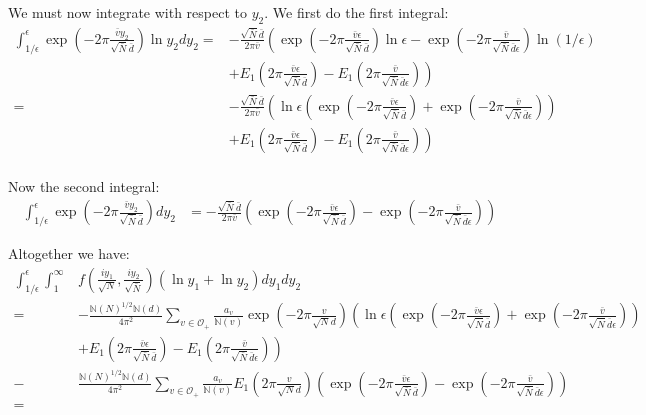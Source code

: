 \documentclass{article}
\theoremstyle{plain}
\begin{document}
We must now integrate with respect to $y_2$. We first do the first integral:
\begin{align*}
\int_{1/\epsilon}^{\epsilon} \exp \left( -2\pi \frac{\bar{v} y_2}{\sqrt{\bar{N}}\bar{d}}\right) \ln y_2 dy_2
 = & -\frac{\sqrt{\bar{N}}\bar{d}}{2 \pi\bar{v}} \left( \exp \left( -2\pi \frac{\bar{v} \epsilon}{\sqrt{\bar{N}}\bar{d}}\right) \ln \epsilon -  \exp \left( -2\pi \frac{\bar{v} }{\sqrt{\bar{N}}\bar{d}\epsilon}\right) \ln(1/\epsilon) \right. \\
 & + \left. E_1\left(2\pi \frac{\bar{v} \epsilon}{\sqrt{\bar{N}}\bar{d}}\right)-E_1\left( 2\pi \frac{\bar{v} }{\sqrt{\bar{N}}\bar{d}\epsilon}\right) \right)\\
= & -\frac{\sqrt{\bar{N}}\bar{d}}{2 \pi\bar{v}} \left( \ln \epsilon \left( \exp \left( -2\pi \frac{\bar{v} \epsilon}{\sqrt{\bar{N}}\bar{d}}\right) +  \exp \left( -2\pi \frac{\bar{v} }{\sqrt{\bar{N}}\bar{d}\epsilon}\right) \right) \right. \\
 & + \left. E_1\left(2\pi \frac{\bar{v} \epsilon}{\sqrt{\bar{N}}\bar{d}}\right)-E_1\left( 2\pi \frac{\bar{v} }{\sqrt{\bar{N}}\bar{d}\epsilon}\right) \right)\\
\end{align*}

Now the second integral:
\begin{align*}
\int_{1/ \epsilon}^{\epsilon} \exp \left( -2\pi \frac{\bar{v} y_2}{\sqrt{\bar{N}}\bar{d}}\right) dy_2 
& =  - \frac{\sqrt{\bar{N}}\bar{d}}{2 \pi \bar{v}} \left( \exp \left( -2\pi \frac{\bar{v} \epsilon}{\sqrt{\bar{N}}\bar{d}}\right) -  \exp \left( -2\pi \frac{\bar{v} }{\sqrt{\bar{N}}\bar{d}\epsilon}\right)\right)
\end{align*}

Altogether we have:
\begin{align*}
\int_{1/\epsilon}^{\epsilon} \int_{1}^{\infty} & f\left(\frac{iy_1}{\sqrt{N}},\frac{iy_2}{\sqrt{\bar{N}}}\right) (\ln y_1+\ln y_2)dy_1 dy_2 \\
= &- \frac{\mathbb{N}(N)^{1/2}\mathbb{N}(d)}{4 \pi^2 }\sum_{v \in \mathcal{O}_+}  \frac{a_v}{\mathbb{N}(v)}  \exp\left( -2\pi \frac{v}{\sqrt{N} d}\right) \left( \ln \epsilon \left( \exp \left( -2\pi \frac{\bar{v} \epsilon}{\sqrt{\bar{N}}\bar{d}}\right) +  \exp \left( -2\pi \frac{\bar{v} }{\sqrt{\bar{N}}\bar{d}\epsilon}\right) \right) \right. \\
& + \left. E_1\left(2\pi \frac{\bar{v} \epsilon}{\sqrt{\bar{N}}\bar{d}}\right)-E_1\left( 2\pi \frac{\bar{v} }{\sqrt{\bar{N}}\bar{d}\epsilon}\right) \right) \\
- & \frac{\mathbb{N}(N)^{1/2}\mathbb{N}(d)}{4 \pi^2 } \sum_{v \in \mathcal{O}_+} \frac{a_v}{\mathbb{N}(v)}  E_1\left( 2\pi \frac{v}{\sqrt{N} d}\right) \left( \exp \left( -2\pi \frac{\bar{v} \epsilon}{\sqrt{\bar{N}}\bar{d}}\right) -  \exp \left( -2\pi \frac{\bar{v} }{\sqrt{\bar{N}}\bar{d}\epsilon}\right)\right)\\
= & 
\end{align*}
\end{document}
